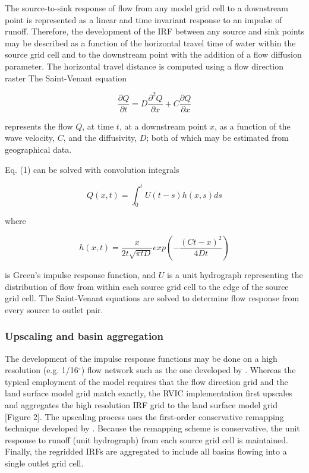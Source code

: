 \documentclass[jgrga, draft]{agutex}
\begin{document}
\begin{article}
The source-to-sink response of flow from any model grid cell to a downstream point is represented as a linear and time invariant response to an impulse of runoff.
Therefore, the development of the IRF between any source and sink points may be described as a function of the horizontal travel time of water within the source grid cell and to the downstream point with the addition of a flow diffusion parameter.
The horizontal travel distance is computed using a flow direction raster \citep[e.g.][]{Wu_2011}
The Saint-Venant equation

 \begin{equation}
     \frac{\partial Q}{\partial t} = D \frac{\partial^2 Q}{\partial x} + C \frac{\partial Q}{\partial x}
 \end{equation}

represents the flow $Q$, at time $t$, at a downstream point $x$, as a function of the wave velocity, $C$, and the diffusivity, $D$; both of which may be estimated from geographical data.

Eq. (1) can be solved with convolution integrals

 \begin{equation}
	Q(x,t) = \int_0^t U(t-s)h(x,s)ds
 \end{equation}

where

 \begin{equation}
	h(x, t) = \frac{x}{2t\sqrt{\pi tD}}exp\left(-\frac{(Ct-x)^2}{4Dt}\right)
 \end{equation}

is Green’s impulse response function, and $U$ is a unit hydrograph representing the distribution of flow from within each source grid cell to the edge of the source grid cell.
The Saint-Venant equations are solved to determine flow response from every source to outlet pair.

\subsubsection{Upscaling and basin aggregation}
\label{sec:remap}

The development of the impulse response functions may be done on a high resolution (e.g. 1/16$^{\circ}$) flow network such as the one developed by \citet{Wu_2011}.
Whereas the typical employment of the \citet{Lohmann_1996} model requires that the flow direction grid and the land surface model grid match exactly, the RVIC implementation first upscales and aggregates the high resolution IRF grid to the land surface model grid [Figure 2].
The upscaling process uses the first-order conservative remapping technique developed by \citep{Jones_1999}.
Because the remapping scheme is conservative, the unit response to runoff (unit hydrograph) from each source grid cell is maintained.
Finally, the regridded IRFs are aggregated to include all basins flowing into a single outlet grid cell.


\end{article}
\end{document}
